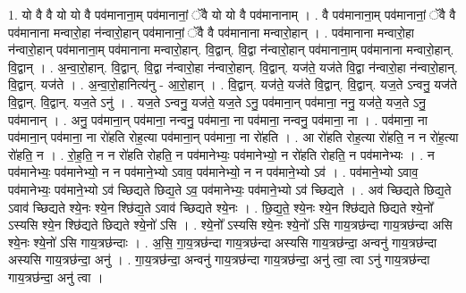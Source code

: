 \documentclass[17pt]{extarticle}
\begin{document}
1. यो वै वै यो यो वै पव॑मानाना॒म् पव॑मानानां॒ ॅवै यो यो वै पव॑मानानाम् । . वै पव॑मानाना॒म् पव॑मानानां॒ ॅवै वै पव॑मानाना मन्वारो॒हा न॑न्वारो॒हान् पव॑मानानां॒ ॅवै वै पव॑मानाना मन्वारो॒हान् । . पव॑मानाना मन्वारो॒हा न॑न्वारो॒हान् पव॑मानाना॒म् पव॑मानाना मन्वारो॒हान्. वि॒द्वान्. वि॒द्वा न॑न्वारो॒हान् पव॑मानाना॒म् पव॑मानाना मन्वारो॒हान्. वि॒द्वान् । . अ॒न्वा॒रो॒हान्. वि॒द्वान्. वि॒द्वा न॑न्वारो॒हा न॑न्वारो॒हान्. वि॒द्वान्. यज॑ते॒ यज॑ते वि॒द्वा न॑न्वारो॒हा न॑न्वारो॒हान्. वि॒द्वान्. यज॑ते । . अ॒न्वा॒रो॒हानित्य॑नु - आ॒रो॒हान् । . वि॒द्वान्. यज॑ते॒ यज॑ते वि॒द्वान्. वि॒द्वान्. यज॒ते ऽन्वनु॒ यज॑ते वि॒द्वान्. वि॒द्वान्. यज॒ते ऽनु॑ । . यज॒ते ऽन्वनु॒ यज॑ते॒ यज॒ते ऽनु॒ पव॑माना॒न् पव॑माना॒ ननु॒ यज॑ते॒ यज॒ते ऽनु॒ पव॑मानान् । . अनु॒ पव॑माना॒न् पव॑माना॒ नन्वनु॒ पव॑माना॒ ना पव॑माना॒ नन्वनु॒ पव॑माना॒ ना । . पव॑माना॒ ना पव॑माना॒न् पव॑माना॒ ना रो॑हति रोह॒त्या पव॑माना॒न् पव॑माना॒ ना रो॑हति । . आ रो॑हति रोह॒त्या रो॑हति॒ न न रो॑ह॒त्या रो॑हति॒ न । . रो॒ह॒ति॒ न न रो॑हति रोहति॒ न पव॑मानेभ्यः॒ पव॑मानेभ्यो॒ न रो॑हति रोहति॒ न पव॑मानेभ्यः । . न पव॑मानेभ्यः॒ पव॑मानेभ्यो॒ न न पव॑माने॒भ्यो ऽवाव॒ पव॑मानेभ्यो॒ न न पव॑माने॒भ्यो ऽव॑ । . पव॑माने॒भ्यो ऽवाव॒ पव॑मानेभ्यः॒ पव॑माने॒भ्यो ऽव॑ च्छिद्यते छिद्य॒ते ऽव॒ पव॑मानेभ्यः॒ पव॑माने॒भ्यो ऽव॑ च्छिद्यते । . अव॑ च्छिद्यते छिद्य॒ते ऽवाव॑ च्छिद्यते श्ये॒नः श्ये॒न श्छि॑द्य॒ते ऽवाव॑ च्छिद्यते श्ये॒नः । . छि॒द्य॒ते॒ श्ये॒नः श्ये॒न श्छि॑द्यते छिद्यते श्ये॒नो᳚ ऽस्यसि श्ये॒न श्छि॑द्यते छिद्यते श्ये॒नो॑ ऽसि । . श्ये॒नो᳚ ऽस्यसि श्ये॒नः श्ये॒नो॑ ऽसि गाय॒त्रछ॑न्दा गाय॒त्रछ॑न्दा असि श्ये॒नः श्ये॒नो॑ ऽसि गाय॒त्रछ॑न्दाः । . अ॒सि॒ गा॒य॒त्रछ॑न्दा गाय॒त्रछ॑न्दा अस्यसि गाय॒त्रछ॑न्दा॒ अन्वनु॑ गाय॒त्रछ॑न्दा अस्यसि गाय॒त्रछ॑न्दा॒ अनु॑ । . गा॒य॒त्रछ॑न्दा॒ अन्वनु॑ गाय॒त्रछ॑न्दा गाय॒त्रछ॑न्दा॒ अनु॑ त्वा॒ त्वा ऽनु॑ गाय॒त्रछ॑न्दा गाय॒त्रछ॑न्दा॒ अनु॑ त्वा । \newline
\end{document}
